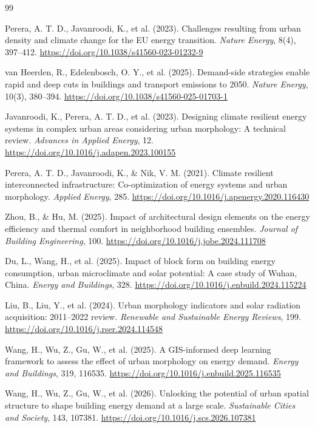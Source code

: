 \begin{thebibliography}{99}

Perera, A. T. D., Javanroodi, K., et al. (2023). Challenges resulting from urban density and climate change for the EU energy transition. \textit{Nature Energy}, 8(4), 397--412. \url{https://doi.org/10.1038/s41560-023-01232-9}

van Heerden, R., Edelenbosch, O. Y., et al. (2025). Demand-side strategies enable rapid and deep cuts in buildings and transport emissions to 2050. \textit{Nature Energy}, 10(3), 380--394. \url{https://doi.org/10.1038/s41560-025-01703-1}

Javanroodi, K., Perera, A. T. D., et al. (2023). Designing climate resilient energy systems in complex urban areas considering urban morphology: A technical review. \textit{Advances in Applied Energy}, 12. \url{https://doi.org/10.1016/j.adapen.2023.100155}

Perera, A. T. D., Javanroodi, K., \& Nik, V. M. (2021). Climate resilient interconnected infrastructure: Co-optimization of energy systems and urban morphology. \textit{Applied Energy}, 285. \url{https://doi.org/10.1016/j.apenergy.2020.116430}

Zhou, B., \& Hu, M. (2025). Impact of architectural design elements on the energy efficiency and thermal comfort in neighborhood building ensembles. \textit{Journal of Building Engineering}, 100. \url{https://doi.org/10.1016/j.jobe.2024.111708}

Du, L., Wang, H., et al. (2025). Impact of block form on building energy consumption, urban microclimate and solar potential: A case study of Wuhan, China. \textit{Energy and Buildings}, 328. \url{https://doi.org/10.1016/j.enbuild.2024.115224}

Liu, B., Liu, Y., et al. (2024). Urban morphology indicators and solar radiation acquisition: 2011--2022 review. \textit{Renewable and Sustainable Energy Reviews}, 199. \url{https://doi.org/10.1016/j.rser.2024.114548}

Wang, H., Wu, Z., Gu, W., et al. (2025). A GIS-informed deep learning framework to assess the effect of urban morphology on energy demand. \textit{Energy and Buildings}, 319, 116535. \url{https://doi.org/10.1016/j.enbuild.2025.116535}

Wang, H., Wu, Z., Gu, W., et al. (2026). Unlocking the potential of urban spatial structure to shape building energy demand at a large scale. \textit{Sustainable Cities and Society}, 143, 107381. \url{https://doi.org/10.1016/j.scs.2026.107381}


\end{thebibliography}
